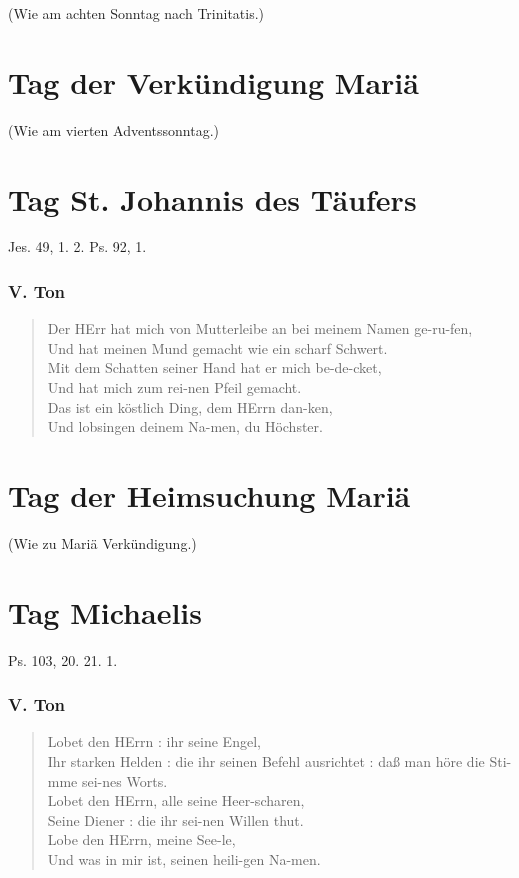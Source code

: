 (Wie am achten Sonntag nach Trinitatis.)

\section{Tag der Verkündigung Mariä}

(Wie am vierten Adventssonntag.)

\section{Tag St. Johannis des Täufers}

Jes. 49, 1. 2. Ps. 92, 1.

\subsubsection{V. Ton}
\begin{verse}
Der HErr hat mich von Mutterleibe an bei meinem Namen ge-ru-fen,\\
Und hat meinen Mund gemacht wie ein scharf Schwert.\\
Mit dem Schatten seiner Hand hat er mich be-de-cket,\\
Und hat mich zum rei-nen Pfeil gemacht.\\
Das ist ein köstlich Ding, dem HErrn dan-ken,\\
Und lobsingen deinem Na-men, du Höchster.
\end{verse}

\section{Tag der Heimsuchung Mariä}

(Wie zu Mariä Verkündigung.)

\section{Tag Michaelis}

Ps. 103, 20. 21. 1.

\subsubsection{V. Ton}
\begin{verse}
Lobet den HErrn : ihr seine Engel,\\
Ihr starken Helden : die ihr seinen Befehl ausrichtet : daß man höre die Sti-mme sei-nes Worts.\\
Lobet den HErrn, alle seine Heer-scharen,\\
Seine Diener : die ihr sei-nen Willen thut.\\
Lobe den HErrn, meine See-le,\\
Und was in mir ist, seinen heili-gen Na-men.
\end{verse}

